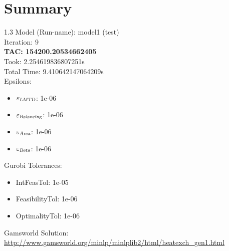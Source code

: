 \documentclass{article}%
\begin{document}
%
\normalsize%
\section{Summary}%
\thispagestyle{plain}%
\begin{spacing}{1.3}%
\Large%
Model (Run-name): model1 (test)\\%
Iteration: 9\\%
\textbf{TAC: 154200.20534662405}\\%
Took: 2.254619836807251s\\%
Total Time: 9.410642147064209s\\%
Epsilons:%
\begin{itemize}%
	\item $\varepsilon_{\textsl{LMTD}}$: 1e-06%
	\item $\varepsilon_{\textsl{Balancing}}$: 1e-06%
	\item $\varepsilon_{\textsl{Area}}$: 1e-06%
	\item $\varepsilon_{\textsl{Beta}}$: 1e-06%
\end{itemize}%
Gurobi Tolerances:%
\begin{itemize}%
	\item IntFeasTol: 1e-05%
	\item FeasibilityTol: 1e-06%
	\item OptimalityTol: 1e-06%
\end{itemize}%
\end{spacing}%
\normalsize%
Gamsworld Solution: \url{http://www.gamsworld.org/minlp/minlplib2/html/heatexch_gen1.html}%
%
\clearpage%
\end{document}

